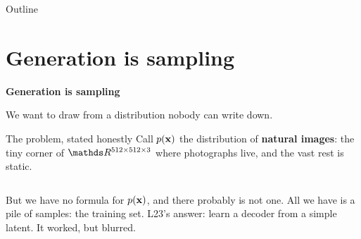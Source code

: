 \documentclass[aspectratio=169]{beamer}
\begin{document}
\begin{frame}{Outline}
  \tableofcontents
\end{frame}

\section{Generation is sampling}

\begin{frame}[plain]
  \vfill
  \begin{center}
    {\Large\color{popblue}\textbf{Generation is sampling}}\\[0.9em]
    \begin{minipage}{0.82\textwidth}\centering\small
      We want to draw from a distribution nobody can write down.
    \end{minipage}
  \end{center}
  \vfill
\end{frame}

\begin{frame}{The problem, stated honestly}
  \small
  Call $p(\mathbf{x})$ the distribution of \textbf{natural images}: the tiny corner of
  $\R^{512\times512\times3}$ where photographs live, and the vast rest is static.
  \vskip 6pt
  \begin{columns}[T]
    \vskip 8pt
    But we have no formula for $p(\mathbf{x})$, and there probably is not one. All we have is a
    pile of samples: the training set.
    \vskip 8pt
    \footnotesize
    L23's answer: learn a decoder from a simple latent. It worked, but blurred.
  \end{columns}
\end{frame}
\end{document}
